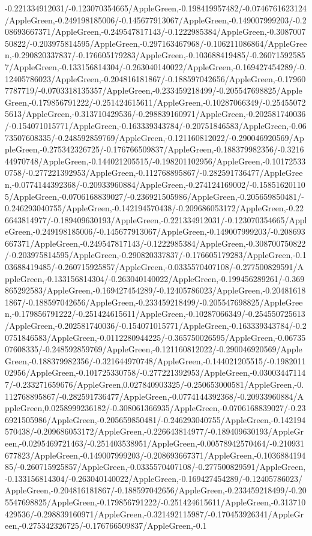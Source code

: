 {\begin{tikzternal}
{-0.221334912031/-0.123070354665/AppleGreen,-0.198419957482/-0.0746761623124/AppleGreen,-0.249198185006/-0.145677913067/AppleGreen,-0.149007999203/-0.208693667371/AppleGreen,-0.249547817143/-0.1222985384/AppleGreen,-0.308700750822/-0.203975814595/AppleGreen,-0.297163467968/-0.106211086864/AppleGreen,-0.290820337837/-0.176605179283/AppleGreen,-0.103688419485/-0.260715925857/AppleGreen,-0.133156814304/-0.263040140022/AppleGreen,-0.169427454289/-0.12405786023/AppleGreen,-0.204816181867/-0.188597042656/AppleGreen,-0.179607787719/-0.0703318135357/AppleGreen,-0.233459218499/-0.205547698825/AppleGreen,-0.179856791222/-0.251424615611/AppleGreen,-0.10287066349/-0.254550725613/AppleGreen,-0.313710429536/-0.298839160971/AppleGreen,-0.202581740036/-0.154071015771/AppleGreen,-0.163339343784/-0.20751846583/AppleGreen,-0.0673507608335/-0.248592859769/AppleGreen,-0.121160812022/-0.290046920569/AppleGreen,-0.275342326725/-0.176766509837/AppleGreen,-0.188379982356/-0.321644970748/AppleGreen,-0.144021205515/-0.198201102956/AppleGreen,-0.101725330758/-0.277221392953/AppleGreen,-0.112768895867/-0.282591736477/AppleGreen,-0.0774144392368/-0.20933960884/AppleGreen,-0.274124169002/-0.158516201105/AppleGreen,-0.0706168839027/-0.236921505986/AppleGreen,-0.205659850481/-0.246293040755/AppleGreen,-0.142194570438/-0.209686053172/AppleGreen,-0.226643814977/-0.189409630193/AppleGreen,-0.221334912031/-0.123070354665/AppleGreen,-0.249198185006/-0.145677913067/AppleGreen,-0.149007999203/-0.208693667371/AppleGreen,-0.249547817143/-0.1222985384/AppleGreen,-0.308700750822/-0.203975814595/AppleGreen,-0.290820337837/-0.176605179283/AppleGreen,-0.103688419485/-0.260715925857/AppleGreen,-0.0335570407108/-0.277500829591/AppleGreen,-0.133156814304/-0.263040140022/AppleGreen,-0.199456289261/-0.369865292583/AppleGreen,-0.169427454289/-0.12405786023/AppleGreen,-0.204816181867/-0.188597042656/AppleGreen,-0.233459218499/-0.205547698825/AppleGreen,-0.179856791222/-0.251424615611/AppleGreen,-0.10287066349/-0.254550725613/AppleGreen,-0.202581740036/-0.154071015771/AppleGreen,-0.163339343784/-0.20751846583/AppleGreen,-0.0112280944225/-0.365750026595/AppleGreen,-0.0673507608335/-0.248592859769/AppleGreen,-0.121160812022/-0.290046920569/AppleGreen,-0.188379982356/-0.321644970748/AppleGreen,-0.144021205515/-0.198201102956/AppleGreen,-0.101725330758/-0.277221392953/AppleGreen,-0.030034471147/-0.233271659676/AppleGreen,0.027840903325/-0.250653000581/AppleGreen,-0.112768895867/-0.282591736477/AppleGreen,-0.0774144392368/-0.20933960884/AppleGreen,0.0258999236182/-0.308061366935/AppleGreen,-0.0706168839027/-0.236921505986/AppleGreen,-0.205659850481/-0.246293040755/AppleGreen,-0.142194570438/-0.209686053172/AppleGreen,-0.226643814977/-0.189409630193/AppleGreen,-0.0295469721463/-0.251403538951/AppleGreen,-0.00578942570464/-0.210931677823/AppleGreen,-0.149007999203/-0.208693667371/AppleGreen,-0.103688419485/-0.260715925857/AppleGreen,-0.0335570407108/-0.277500829591/AppleGreen,-0.133156814304/-0.263040140022/AppleGreen,-0.169427454289/-0.12405786023/AppleGreen,-0.204816181867/-0.188597042656/AppleGreen,-0.233459218499/-0.205547698825/AppleGreen,-0.179856791222/-0.251424615611/AppleGreen,-0.313710429536/-0.298839160971/AppleGreen,-0.321492115987/-0.170453926341/AppleGreen,-0.275342326725/-0.176766509837/AppleGreen,-0.1}
\end{tikzternal}}
